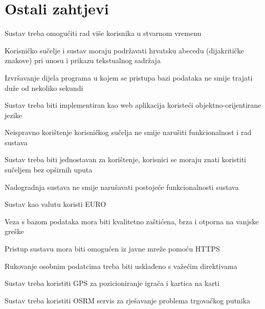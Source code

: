		\section{Ostali zahtjevi}
		\begin{packed_item}
		    \item Sustav treba omogućiti rad više korisnika u stvarnom vremenu
			\item Korisničko sučelje i sustav moraju podržavati hrvatsku abecedu (dijakritičke znakove) pri unosu i prikazu tekstualnog sadržaja
			\item Izvršavanje dijela programa u kojem se pristupa bazi podataka ne smije trajati duže od nekoliko sekundi
			\item Sustav treba biti implementiran kao web aplikacija koristeći objektno-orijentirane jezike
			\item Neispravno korištenje korisničkog sučelja ne smije narušiti funkcionalnost i rad sustava
			\item Sustav treba biti jednostavan za korištenje, korisnici se moraju znati koristiti sučeljem bez opširnih uputa
			\item Nadogradnja sustava ne smije narušavati postojeće funkcionalnosti sustava
			\item Sustav kao valutu koristi EURO
			\item Veza s bazom podataka mora biti kvalitetno zaštićena, brza i otporna na vanjske greške
			\item Pristup sustavu mora biti omogućen iz javne mreže pomoću HTTPS
			\item Rukovanje osobnim podatcima treba biti usklađeno s važećim direktivama
			\item Sustav treba koristiti GPS za pozicioniranje igrača i kartica na karti
			\item Sustav treba koristiti OSRM servis za rješavanje problema trgovačkog putnika
			
		\end{packed_item}